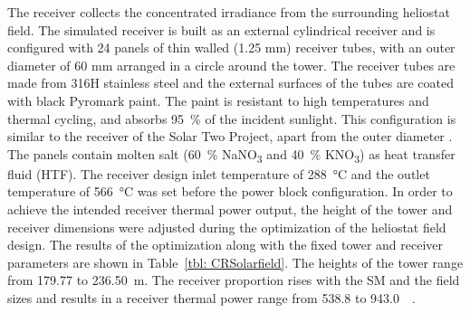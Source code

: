 The receiver collects the concentrated irradiance from the surrounding heliostat field. The simulated receiver is built as an external cylindrical receiver and is configured with 24 panels of thin walled (1.25 mm) receiver tubes, with an outer diameter of 60 mm arranged in a circle around the tower. The receiver tubes are made from 316H stainless steel and the external surfaces of the tubes are coated with black Pyromark paint. The paint is resistant to high temperatures and thermal cycling, and absorbs \SI{95}{\percent} of the incident sunlight. This configuration is similar to the receiver of the Solar Two Project, apart from the outer diameter \cite{Bradshaw2002}. The panels contain molten salt (\SI{60}{\percent} NaNO\textsubscript{3} and \SI{40}{\percent} KNO\textsubscript{3}) as heat transfer fluid (HTF). The receiver design inlet temperature of \SI{288}{\celsius} and the outlet temperature of \SI{566}{\celsius} was set before the power block configuration. In order to achieve the intended receiver thermal power output, the height of the tower and receiver dimensions were adjusted during the optimization of the heliostat field design. The results of the optimization along with the fixed tower and receiver parameters are shown in Table~\ref{tbl: CRSolarfield}. The heights of the tower range from \num{179.77} to \SI{236.50}{m}. The receiver proportion rises with the SM and the field sizes and results in a receiver thermal power range from 538.8 to \SI{943.0}{\mega\wattth}.


